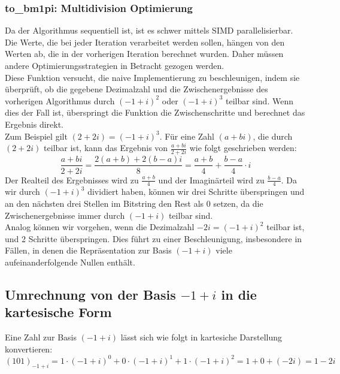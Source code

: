 \documentclass[course=erap]{aspdoc}
\begin{document}
\subsubsection{to\_bm1pi: Multidivision  Optimierung}
Da der Algorithmus sequentiell ist, ist es schwer mittels SIMD parallelisierbar. Die Werte, die bei jeder Iteration verarbeitet werden sollen, hängen von den Werten ab, die in der vorherigen Iteration berechnet wurden. Daher müssen andere Optimierungsstrategien in Betracht gezogen werden.\\
Diese Funktion versucht, die naive Implementierung zu beschleunigen, indem sie überprüft, ob die gegebene Dezimalzahl und die Zwischenergebnisse des vorherigen Algorithmus durch $(-1 + i) ^ 2$ oder $(-1 + i) ^3$ teilbar sind. Wenn dies der Fall ist, überspringt die Funktion die Zwischenschritte und berechnet das Ergebnis direkt.\\
Zum Beispiel gilt $(2 + 2i) = (-1 + i) ^ 3$. Für eine Zahl $(a + bi)$, die durch $(2 + 2i)$ teilbar ist, kann das Ergebnis von $\frac{a + bi}{2 + 2i}$ wie folgt geschrieben werden:
$$\frac{a + bi}{2 + 2i} 
=\frac{2(a + b) + 2(b - a)i}{8}
=\frac{a + b}{4} + \frac{b - a}{4}\cdot i$$
Der Realteil des Ergebnisses wird zu $\frac{a + b}{4}$ und der Imaginärteil wird zu $\frac{b - a}{4}$. Da wir durch $(-1 + i) ^ 3$ dividiert haben, können wir drei Schritte überspringen und an den nächsten drei Stellen im Bitstring den Rest als 0 setzen, da die Zwischenergebnisse immer durch $(-1 + i)$ teilbar sind.\\
Analog können wir vorgehen, wenn die Dezimalzahl $-2i = (-1 + i) ^ 2$ teilbar ist, und 2 Schritte überspringen. Dies führt zu einer Beschleunigung, insbesondere in Fällen, in denen die Repräsentation zur Basis $(-1 + i)$ viele aufeinanderfolgende Nullen enthält.
\subsection{Umrechnung von der Basis $-1 + i$ in die kartesische Form}
Eine Zahl zur Basis $(-1 + i)$ lässt sich wie folgt in kartesiche Darstellung konvertieren:
$$(101)_{-1+i}
= 1\cdot(-1 + i)^{0} + 0\cdot(-1 + i)^{1} +1\cdot(-1 + i)^{2} = 1 + 0 + (-2i) = 1-2i$$
\end{document}
